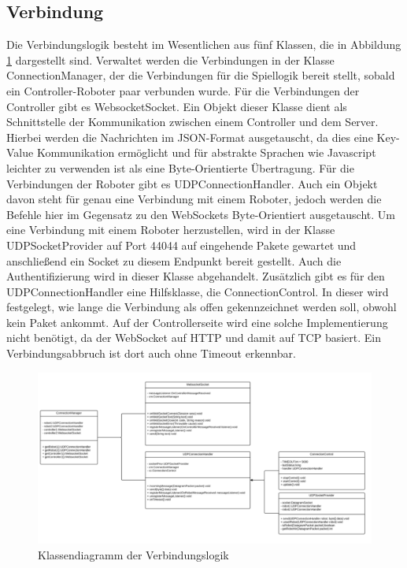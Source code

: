 \subsection{Verbindung}
Die Verbindungslogik besteht im Wesentlichen aus fünf Klassen, die in Abbildung \ref{fig:uml_verbindung} dargestellt sind. Verwaltet werden die Verbindungen in der Klasse ConnectionManager, der die Verbindungen für die Spiellogik bereit stellt, sobald ein Controller-Roboter paar verbunden wurde. Für die Verbindungen der Controller gibt es WebsocketSocket. Ein Objekt dieser Klasse dient als Schnittstelle der Kommunikation zwischen einem Controller und dem Server. Hierbei werden die Nachrichten im JSON-Format ausgetauscht, da dies eine Key-Value Kommunikation ermöglicht und für abstrakte Sprachen wie Javascript leichter zu verwenden ist als eine Byte-Orientierte Übertragung. Für die Verbindungen der Roboter gibt es UDPConnectionHandler. Auch ein Objekt davon steht für genau eine Verbindung mit einem Roboter, jedoch werden die Befehle hier im Gegensatz zu den WebSockets Byte-Orientiert ausgetauscht. Um eine Verbindung mit einem Roboter herzustellen, wird in der Klasse UDPSocketProvider auf Port 44044 auf eingehende Pakete gewartet und anschließend ein Socket zu diesem Endpunkt bereit gestellt. Auch die Authentifizierung wird in dieser Klasse abgehandelt. Zusätzlich gibt es für den UDPConnectionHandler eine Hilfsklasse, die ConnectionControl. In dieser wird festgelegt, wie lange die Verbindung als offen gekennzeichnet werden soll, obwohl kein Paket ankommt. Auf der Controllerseite wird eine solche Implementierung nicht benötigt, da der WebSocket auf HTTP und damit auf TCP basiert. Ein Verbindungsabbruch ist dort auch ohne Timeout erkennbar.


\begin{figure}[h]
	\includegraphics[width=\textwidth]{images/uml_verbindung.pdf}
	\caption{Klassendiagramm der Verbindungslogik}
	\label{fig:uml_verbindung}
\end{figure}



